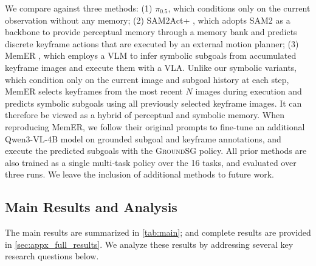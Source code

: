 We compare against three methods:
(1) $\pi_{0.5}$, which conditions only on the current observation without any memory;
(2) SAM2Act+ \cite{fang2025sam2act}, which adopts SAM2 as a backbone to provide perceptual memory through a memory bank and predicts discrete keyframe actions that are executed by an external motion planner;
(3) MemER \cite{sridhar2025memer}, which employs a VLM to infer symbolic subgoals from accumulated keyframe images and execute them with a VLA.
Unlike our symbolic variants, which condition only on the current image and subgoal history at each step, MemER selects keyframes from the most recent $N$ images during execution and predicts symbolic subgoals using all previously selected keyframe images. It can therefore be viewed as a hybrid of perceptual and symbolic memory. When reproducing MemER, we follow their original prompts to fine-tune an additional Qwen3-VL-4B model on grounded subgoal and keyframe annotations, and execute the predicted subgoals with the \textsc{GroundSG} policy.
All prior methods are also trained as a single multi-task policy over the 16 tasks, and evaluated over three runs. We leave the inclusion of additional methods to future work.


\subsection{Main Results and Analysis}





The main results are summarized in \cref{tab:main}; and complete results are provided in \cref{sec:appx_full_results}. We analyze these results by addressing several key research questions below.

